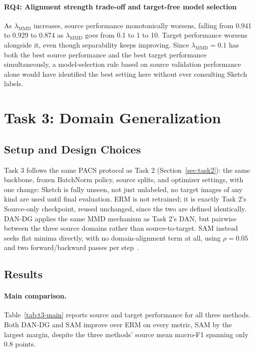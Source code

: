 \documentclass{article}
\begin{document}
\paragraph{RQ4: Alignment strength trade-off and target-free model selection}

As $\lambda_\text{MMD}$ increases, source performance monotonically worsens, falling from 0.941 to 0.929 to 0.874 as $\lambda_\text{MMD}$ goes from 0.1 to 1 to 10. Target performance worsens alongside it, even though separability keeps improving. Since $\lambda_\text{MMD}=0.1$ has both the best source performance and the best target performance simultaneously, a model-selection rule based on source validation performance alone would have identified the best setting here without ever consulting Sketch labels.
\section{Task 3: Domain Generalization}
\label{sec:task3}

\subsection{Setup and Design Choices}

Task 3 follows the same PACS protocol as Task 2 (Section~\ref{sec:task2}): the same backbone, frozen BatchNorm policy, source splits, and optimizer settings, with one change: Sketch is fully unseen, not just unlabeled, no target images of any kind are used until final evaluation. ERM is not retrained; it is exactly Task 2's Source-only checkpoint, reused unchanged, since the two are defined identically. DAN-DG applies the same MMD mechanism as Task 2's DAN, but pairwise between the three source domains rather than source-to-target. SAM instead seeks flat minima directly, with no domain-alignment term at all, using $\rho=0.05$ and two forward/backward passes per step~\citep{foret2021sam}.

\subsection{Results}

\paragraph{Main comparison.}
Table~\ref{tab:t3-main} reports source and target performance for all three methods. Both DAN-DG and SAM improve over ERM on every metric, SAM by the largest margin, despite the three methods' source mean macro-F1 spanning only 0.8 points.
\end{document}
